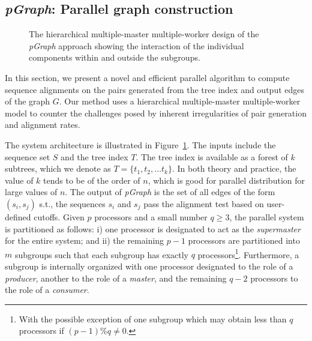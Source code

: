 \documentclass[10pt,journal,letterpaper,compsoc]{IEEEtran}
\begin{document}



\subsection{{\it pGraph}: Parallel graph construction}
\label{secMasterSlave}



\begin{figure}[tb]
\centerline{
						\scalebox{0.65}{}
            }
\caption{
The hierarchical multiple-master multiple-worker design of the {\it pGraph} approach showing the interaction of the individual components within and outside the subgroups.
}
\label{figPClust}
\end{figure}

In this section, we present a novel and efficient parallel algorithm to compute sequence alignments on the pairs generated from the tree index and output edges of the graph $G$. Our method uses a hierarchical multiple-master multiple-worker model to counter the challenges posed by inherent irregularities of pair generation and alignment rates. 

The system architecture is illustrated in Figure~\ref{figPClust}. The inputs include the sequence set $S$ and the tree index $T$. The tree index is available as a forest of $k$ subtrees, which we denote as $T=\{t_1,t_2,\ldots t_k\}$. In both theory and practice, the value of $k$ tends to be of the order of $n$, which is good for parallel distribution for large values of $n$. The output of {\it pGraph} is the set of all edges of the form $(s_i,s_j)$ s.t., the sequences $s_i$ and $s_j$ pass the alignment test based on user-defined cutoffs. Given $p$ processors and a small number $q\geq 3$, the parallel system is partitioned as follows: i) one processor is designated to act as the \emph{supermaster} for the entire system; and ii) the remaining $p-1$ processors are partitioned into $m$ subgroups such that each subgroup has exactly $q$ processors\footnote{With the possible exception of one subgroup which may obtain less than $q$ processors if $(p-1)\%q\ne 0$.}. Furthermore, a subgroup is internally organized with one processor designated to the role of a \emph{producer}, another to the role of a \emph{master}, and the remaining $q-2$ processors to the role of a \emph{consumer}. 
\end{document}

